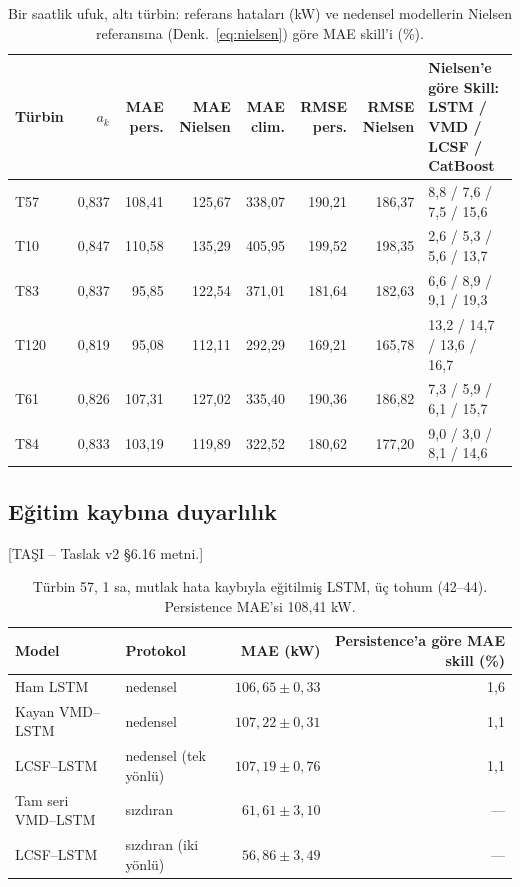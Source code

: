 \documentclass[11pt,a4paper]{article}
\newcommand{\tasi}[1]{\textsf{\small [TAŞI -- #1]}}
\begin{document}
\begin{table}[htbp]\centering
\caption{Bir saatlik ufuk, altı türbin: referans hataları (kW) ve nedensel
modellerin Nielsen referansına (Denk.~\eqref{eq:nielsen}) göre MAE skill'i (\%).}
\scriptsize
\begin{tabular}{lrrrrrrl}
\toprule
Türbin & $a_k$ & MAE pers. & MAE Nielsen & MAE clim. & RMSE pers. &
RMSE Nielsen & Nielsen'e göre Skill: LSTM / VMD / LCSF / CatBoost \\
\midrule
T57  & 0,837 & 108,41 & 125,67 & 338,07 & 190,21 & 186,37 & 8,8 / 7,6 / 7,5 / 15,6 \\
T10  & 0,847 & 110,58 & 135,29 & 405,95 & 199,52 & 198,35 & 2,6 / 5,3 / 5,6 / 13,7 \\
T83  & 0,837 &  95,85 & 122,54 & 371,01 & 181,64 & 182,63 & 6,6 / 8,9 / 9,1 / 19,3 \\
T120 & 0,819 &  95,08 & 112,11 & 292,29 & 169,21 & 165,78 & 13,2 / 14,7 / 13,6 / 16,7 \\
T61  & 0,826 & 107,31 & 127,02 & 335,40 & 190,36 & 186,82 & 7,3 / 5,9 / 6,1 / 15,7 \\
T84  & 0,833 & 103,19 & 119,89 & 322,52 & 180,62 & 177,20 & 9,0 / 3,0 / 8,1 / 14,6 \\
\bottomrule
\end{tabular}
\end{table}

\subsection{Eğitim kaybına duyarlılık}
\tasi{Taslak v2 §6.16 metni.}

\begin{table}[htbp]\centering
\caption{Türbin 57, 1 sa, mutlak hata kaybıyla eğitilmiş LSTM, üç tohum
(42--44). Persistence MAE'si 108,41 kW.}
\footnotesize
\begin{tabular}{llrr}
\toprule
Model & Protokol & MAE (kW) & Persistence'a göre MAE skill (\%) \\
\midrule
Ham LSTM              & nedensel             & $106,65\pm0,33$ & 1,6 \\
Kayan VMD--LSTM       & nedensel             & $107,22\pm0,31$ & 1,1 \\
LCSF--LSTM            & nedensel (tek yönlü) & $107,19\pm0,76$ & 1,1 \\
Tam seri VMD--LSTM    & sızdıran             & $61,61\pm3,10$  & --- \\
LCSF--LSTM            & sızdıran (iki yönlü) & $56,86\pm3,49$  & --- \\
\bottomrule
\end{tabular}
\end{table}
\end{document}
